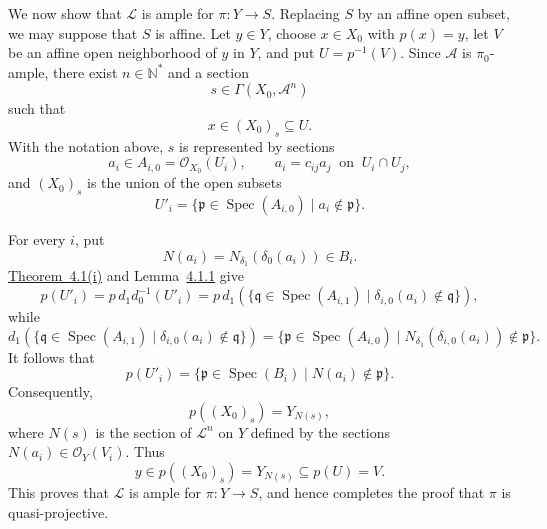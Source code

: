 We now show that \(\mathscr L\) is ample for \(\pi:Y\to S\).
Replacing \(S\) by an affine open subset, we may suppose that \(S\)
is affine. Let \(y\in Y\), choose \(x\in X_0\) with \(p(x)=y\), let
\(V\) be an affine open neighborhood of \(y\) in \(Y\), and put
\(U=p^{-1}(V)\). Since \(\mathscr A\) is \(\pi_0\)-ample, there exist
\(n\in\mathbb N^\ast\) and a section
\[
  s\in\Gamma(X_0,\mathscr A^n)
\]
such that
\[
  x\in(X_0)_s\subseteq U.
\]
With the notation above, \(s\) is represented by sections
\[
  a_i\in A_{i,0}=\mathcal O_{X_0}(U_i),
  \qquad a_i=c_{ij}a_j\ \text{ on }\ U_i\cap U_j,
\]
and \((X_0)_s\) is the union of the open subsets
\[
  U'_i=\{\mathfrak p\in\operatorname{Spec}(A_{i,0})
    \mid a_i\notin\mathfrak p\}.
\]

For every \(i\), put
\[
  N(a_i)=N_{\delta_1}(\delta_0(a_i))\in B_i.
\]
\hyperref[thm:sga3-V-4.1-i]{Theorem~4.1(i)} and
Lemma~\hyperref[lem:sga3-V-4.1.1]{4.1.1} give
\[
  p(U'_i)
  =p\,d_1d_0^{-1}(U'_i)
  =p\,d_1\!\left(
    \{\mathfrak q\in\operatorname{Spec}(A_{i,1})
      \mid\delta_{i,0}(a_i)\notin\mathfrak q\}
    \right),
\]
while
\[
  d_1\!\left(
    \{\mathfrak q\in\operatorname{Spec}(A_{i,1})
      \mid\delta_{i,0}(a_i)\notin\mathfrak q\}
    \right)
  =
  \{\mathfrak p\in\operatorname{Spec}(A_{i,0})
    \mid N_{\delta_1}(\delta_{i,0}(a_i))\notin\mathfrak p\}.
\]
It follows that
\[
  p(U'_i)
  =
  \{\mathfrak p\in\operatorname{Spec}(B_i)
    \mid N(a_i)\notin\mathfrak p\}.
\]
Consequently,
\[
  p((X_0)_s)=Y_{N(s)},
\]
where \(N(s)\) is the section of \(\mathscr L^n\) on \(Y\) defined by
the sections \(N(a_i)\in\mathcal O_Y(V_i)\). Thus
\begin{equation}
  y\in p((X_0)_s)=Y_{N(s)}\subseteq p(U)=V.
  \tag{*}\label{eq:sga3-V-5.1-star}
\end{equation}
This proves that \(\mathscr L\) is ample for \(\pi:Y\to S\), and
hence completes the proof that \(\pi\) is quasi-projective.
